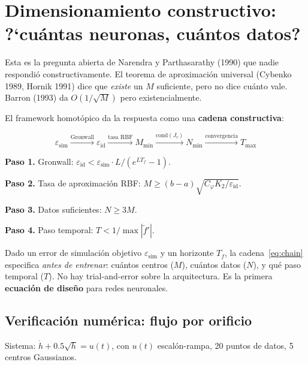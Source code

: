 \documentclass[11pt,a4paper]{article}
\begin{document}
\section{Dimensionamiento constructivo: ?`cu\'antas neuronas, cu\'antos datos?}

Esta es la pregunta abierta de Narendra y Parthasarathy (1990) que nadie respondi\'o constructivamente. El teorema de aproximaci\'on universal (Cybenko 1989, Hornik 1991) dice que \emph{existe} un $M$ suficiente, pero no dice cu\'anto vale. Barron (1993) da $O(1/\sqrt{M})$ pero existencialmente.

El framework homot\'opico da la respuesta como una \textbf{cadena constructiva}:

\begin{equation}
\boxed{\varepsilon_{\mathrm{sim}} \xrightarrow{\text{Gronwall}} \varepsilon_{\mathrm{id}} \xrightarrow{\text{tasa RBF}} M_{\min} \xrightarrow{\text{cond}(J_c)} N_{\min} \xrightarrow{\text{convergencia}} T_{\max}}
\label{eq:chain}
\end{equation}

\textbf{Paso 1.} Gronwall: $\varepsilon_{\mathrm{id}} < \varepsilon_{\mathrm{sim}} \cdot L / (e^{LT_f} - 1)$.

\textbf{Paso 2.} Tasa de aproximaci\'on RBF: $M \geq (b-a)\sqrt{C_\varphi K_2 / \varepsilon_{\mathrm{id}}}$.

\textbf{Paso 3.} Datos suficientes: $N \geq 3M$.

\textbf{Paso 4.} Paso temporal: $T < 1/\max|\tilde{f}'|$.

\begin{resultado}
Dado un error de simulaci\'on objetivo $\varepsilon_{\mathrm{sim}}$ y un horizonte $T_f$, la cadena~\eqref{eq:chain} especifica \emph{antes de entrenar}: cu\'antos centros ($M$), cu\'antos datos ($N$), y qu\'e paso temporal ($T$). No hay trial-and-error sobre la arquitectura. Es la primera \textbf{ecuaci\'on de dise\~no} para redes neuronales.
\end{resultado}

\subsection{Verificaci\'on num\'erica: flujo por orificio}

Sistema: $\dot{h} + 0.5\sqrt{h} = u(t)$, con $u(t)$ escal\'on-rampa, 20 puntos de datos, 5 centros Gaussianos.
\end{document}
